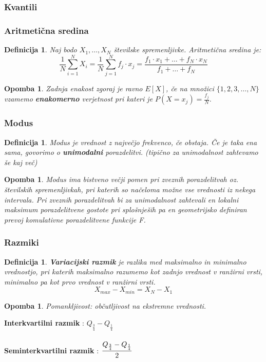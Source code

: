 \documentclass[11pt]{article}
\newtheorem{Definicija}[Izrek]{{\sc Definicija}}
\newtheorem{Opomba}[Izrek]{{\sc Opomba}}
\begin{document}
\subsubsection{Kvantili}
\subsubsection{Aritmetična sredina}
\begin{Definicija}
	Naj bodo $X_1, \ldots ,X_N$ številske spremenljivke. Aritmetična sredina je:
	$$\frac{1}{N}\sum_{i = 1}^{N}X_i = \frac{1}{N}\sum_{j = 1}^{N}{f_j \cdot x_j} = \frac{f_1 \cdot x_1 + \ldots + f_N\cdot x_N}{f_1 + \ldots + f_N}$$
\end{Definicija}
\begin{Opomba}
	Zadnja enakost zgoraj je ravno $E[X]$, če na množici $\{1,2,3,\ldots, N \}$ vzamemo \textbf{enakomerno} verjetnost pri kateri je $P(X = x_j) = \frac{f_j}{N}$.
\end{Opomba}
\subsubsection{Modus}
\begin{Definicija}
	Modus je vrednost z največjo frekvenco, če obstaja. Če je taka ena sama, govorimo o \textbf{unimodalni} porazdelitvi. (tipično za unimodalnost zahtevamo še kaj več)
\end{Definicija}
\begin{Opomba}
	Modus ima bistveno večji pomen pri zveznih porazdelitvah oz. številskih spremenljivkah, pri katerih so načeloma možne vse vrednosti iz nekega intervala. Pri zveznih porazdelitvah bi za unimodalnost zahtevali en lokalni maksimum porazdelitvene gostote pri splošnješih pa en geometrijsko definiran prevoj komulativne porazdelitvene funkcije F.
\end{Opomba}
\subsubsection{Razmiki}
\begin{Definicija}
	\textbf{Variacijski razmik} je razlika med maksimalno in minimalno vrednostjo, pri katerih maksimalno razumemo kot zadnjo vrednost v ranžirni vrsti, minimalno pa kot prvo vrednost v ranžirni vrsti.
	$$ X_{max} - X_{min} = X_N - X_1$$
\end{Definicija}
\begin{Opomba}
	Pomankljivost: občutljivost na ekstremne vrednosti.
\end{Opomba}
	\textbf{Interkvartilni razmik} : $Q_{\frac{3}{4}} - Q_{\frac{1}{4}}$
	\\
	\\
	\textbf{Seminterkvartilni razmik} : $\cfrac{Q_{\frac{3}{4}} - Q_{\frac{1}{4}}}{2}$
\end{document}
